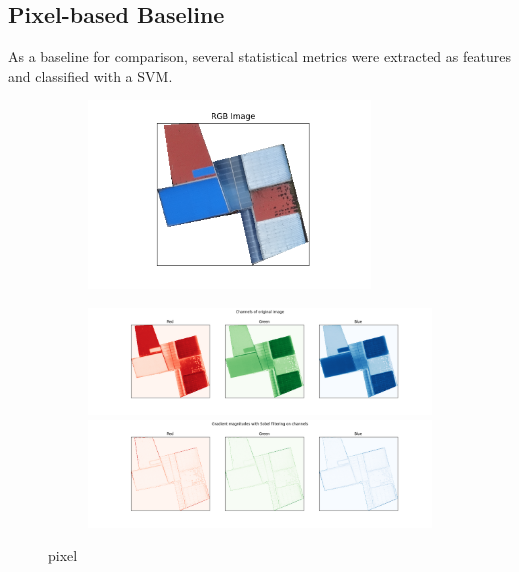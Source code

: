 \documentclass[11pt]{article}
\begin{document}
	\subsection{Pixel-based Baseline }
	As a baseline for comparison, several statistical metrics were extracted as features and classified with a SVM. 
	\begin{figure}
		\centering
		\begin{subfigure}[b]{.4\textwidth}
			\centering
			\includegraphics[width=\textwidth,height=5cm]{figures/pixel_based/rgb.png}
		\end{subfigure}\qquad
		\begin{subfigure}[b]{.55\textwidth}
			\includegraphics[width=\textwidth, trim={3.5cm 0 3cm 0}, clip]{figures/pixel_based/rgb_channels.png}
			
			\vspace{2ex}
			
			\includegraphics[width=\textwidth, trim={3.5cm 0 3cm 0}, clip]{figures/pixel_based/sobel.png}
		\end{subfigure}
		\caption{pixel}
		\label{fig:pixel_based}
	\end{figure}
	
\end{document}
